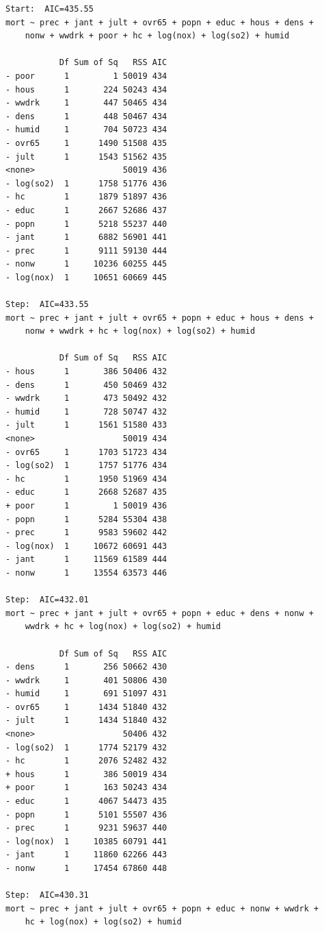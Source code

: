\documentclass[
]{book}
\begin{document}
\begin{verbatim}
Start:  AIC=435.55
mort ~ prec + jant + jult + ovr65 + popn + educ + hous + dens + 
    nonw + wwdrk + poor + hc + log(nox) + log(so2) + humid

           Df Sum of Sq   RSS AIC
- poor      1         1 50019 434
- hous      1       224 50243 434
- wwdrk     1       447 50465 434
- dens      1       448 50467 434
- humid     1       704 50723 434
- ovr65     1      1490 51508 435
- jult      1      1543 51562 435
<none>                  50019 436
- log(so2)  1      1758 51776 436
- hc        1      1879 51897 436
- educ      1      2667 52686 437
- popn      1      5218 55237 440
- jant      1      6882 56901 441
- prec      1      9111 59130 444
- nonw      1     10236 60255 445
- log(nox)  1     10651 60669 445

Step:  AIC=433.55
mort ~ prec + jant + jult + ovr65 + popn + educ + hous + dens + 
    nonw + wwdrk + hc + log(nox) + log(so2) + humid

           Df Sum of Sq   RSS AIC
- hous      1       386 50406 432
- dens      1       450 50469 432
- wwdrk     1       473 50492 432
- humid     1       728 50747 432
- jult      1      1561 51580 433
<none>                  50019 434
- ovr65     1      1703 51723 434
- log(so2)  1      1757 51776 434
- hc        1      1950 51969 434
- educ      1      2668 52687 435
+ poor      1         1 50019 436
- popn      1      5284 55304 438
- prec      1      9583 59602 442
- log(nox)  1     10672 60691 443
- jant      1     11569 61589 444
- nonw      1     13554 63573 446

Step:  AIC=432.01
mort ~ prec + jant + jult + ovr65 + popn + educ + dens + nonw + 
    wwdrk + hc + log(nox) + log(so2) + humid

           Df Sum of Sq   RSS AIC
- dens      1       256 50662 430
- wwdrk     1       401 50806 430
- humid     1       691 51097 431
- ovr65     1      1434 51840 432
- jult      1      1434 51840 432
<none>                  50406 432
- log(so2)  1      1774 52179 432
- hc        1      2076 52482 432
+ hous      1       386 50019 434
+ poor      1       163 50243 434
- educ      1      4067 54473 435
- popn      1      5101 55507 436
- prec      1      9231 59637 440
- log(nox)  1     10385 60791 441
- jant      1     11860 62266 443
- nonw      1     17454 67860 448

Step:  AIC=430.31
mort ~ prec + jant + jult + ovr65 + popn + educ + nonw + wwdrk + 
    hc + log(nox) + log(so2) + humid


\end{verbatim}
\end{document}
